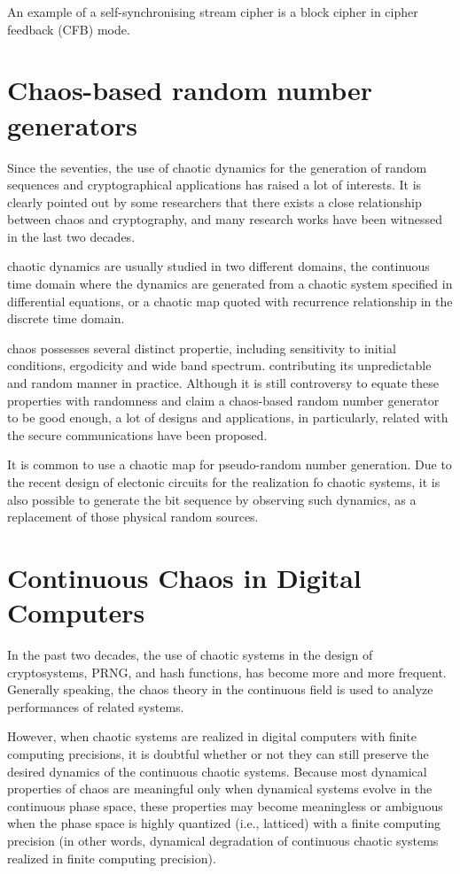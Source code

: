 An example of a self-synchronising stream cipher is a block cipher in cipher feedback (CFB) mode.



\section{Chaos-based random number generators}
Since the seventies, the use of chaotic dynamics for the generation of random sequences and cryptographical applications has raised a lot of interests. It is clearly pointed out by some researchers that there exists a close relationship between chaos and cryptography, and many research works have been witnessed in the last two decades.

chaotic dynamics are usually studied in two different domains, the continuous time domain where the dynamics are generated from a chaotic system specified in differential equations, or a chaotic map quoted with recurrence relationship in the discrete time domain.

chaos possesses several distinct propertie, including sensitivity to initial conditions, ergodicity and wide band spectrum. contributing its unpredictable and random manner in practice. Although it is still controversy to equate these properties with randomness and claim a chaos-based random number generator to be good enough, a lot of designs and applications, in particularly, related with the secure communications have been proposed.

It is common to use a chaotic map for pseudo-random number generation. Due to the recent design of electonic circuits for the realization fo chaotic systems, it is also possible to generate the bit sequence by observing such dynamics, as a replacement of those physical random sources.

\section{Continuous Chaos in Digital Computers}

In the past two decades, the use of chaotic systems in the design of cryptosystems, PRNG, and hash functions, has become more and more frequent.
Generally speaking, the chaos theory in the continuous field is used to analyze performances of related systems. 

However, when chaotic systems are realized in digital computers with finite computing precisions, it is doubtful whether or not they can still preserve the desired dynamics of the continuous chaotic systems. Because most dynamical properties of chaos are meaningful only when dynamical systems evolve in the continuous phase space, these properties may become meaningless or ambiguous when the phase space is highly quantized (i.e., latticed) with a finite computing precision (in other words, dynamical degradation of continuous chaotic systems realized
in finite computing precision). 

